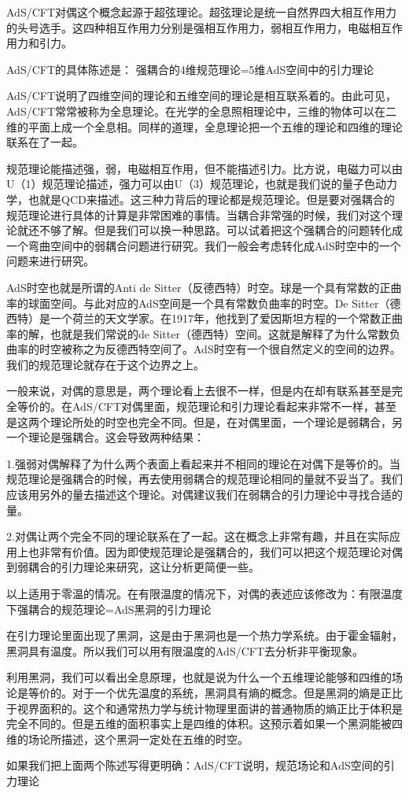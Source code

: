 
AdS/CFT对偶这个概念起源于超弦理论。超弦理论是统一自然界四大相互作用力的头号选手。这四种相互作用力分别是强相互作用力，弱相互作用力，电磁相互作用力和引力。

AdS/CFT的具体陈述是：
强耦合的4维规范理论=5维AdS空间中的引力理论

AdS/CFT说明了四维空间的理论和五维空间的理论是相互联系着的。由此可见，AdS/CFT常常被称为全息理论。在光学的全息照相理论中，三维的物体可以在二维的平面上成一个全息相。同样的道理，全息理论把一个五维的理论和四维的理论联系在了一起。

规范理论能描述强，弱，电磁相互作用，但不能描述引力。比方说，电磁力可以由U（1）规范理论描述，强力可以由U（3）规范理论，也就是我们说的量子色动力学，也就是QCD来描述。这三种力背后的理论都是规范理论。但是要对强耦合的规范理论进行具体的计算是非常困难的事情。当耦合非常强的时候，我们对这个理论就还不够了解。但是我们可以换一种思路。可以试着把这个强耦合的问题转化成一个弯曲空间中的弱耦合问题进行研究。我们一般会考虑转化成AdS时空中的一个问题来进行研究。

AdS时空也就是所谓的Anti de Sitter（反德西特）时空。球是一个具有常数的正曲率的球面空间。与此对应的AdS空间是一个具有常数负曲率的时空。De Sitter（德西特）是一个荷兰的天文学家。在1917年，他找到了爱因斯坦方程的一个常数正曲率的解，也就是我们常说的de Sitter（德西特）空间。这就是解释了为什么常数负曲率的时空被称之为反德西特空间了。AdS时空有一个很自然定义的空间的边界。我们的规范理论就存在于这个边界之上。

一般来说，对偶的意思是，两个理论看上去很不一样，但是内在却有联系甚至是完全等价的。在AdS/CFT对偶里面，规范理论和引力理论看起来非常不一样，甚至是这两个理论所处的时空也完全不同。但是，在对偶里面，一个理论是弱耦合，另一个理论是强耦合。这会导致两种结果：

1.强弱对偶解释了为什么两个表面上看起来并不相同的理论在对偶下是等价的。当规范理论是强耦合的时候，再去使用弱耦合的规范理论相同的量就不妥当了。我们应该用另外的量去描述这个理论。对偶建议我们在弱耦合的引力理论中寻找合适的量。

2.对偶让两个完全不同的理论联系在了一起。这在概念上非常有趣，并且在实际应用上也非常有价值。因为即使规范理论是强耦合的，我们可以把这个规范理论对偶到弱耦合的引力理论来研究，这让分析更简便一些。

以上适用于零温的情况。在有限温度的情况下，对偶的表述应该修改为：有限温度下强耦合的规范理论=AdS黑洞的引力理论

在引力理论里面出现了黑洞，这是由于黑洞也是一个热力学系统。由于霍金辐射，黑洞具有温度。所以我们可以用有限温度的AdS/CFT去分析非平衡现象。

利用黑洞，我们可以看出全息原理，也就是说为什么一个五维理论能够和四维的场论是等价的。对于一个优先温度的系统，黑洞具有熵的概念。但是黑洞的熵是正比于视界面积的。这个和通常热力学与统计物理里面讲的普通物质的熵正比于体积是完全不同的。但是五维的面积事实上是四维的体积。这预示着如果一个黑洞能被四维的场论所描述，这个黑洞一定处在五维的时空。

如果我们把上面两个陈述写得更明确：AdS/CFT说明，规范场论和AdS空间的引力理论

